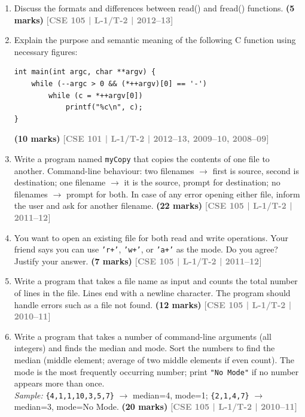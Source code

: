 \documentclass[12pt,a3paper]{article}
\newcommand{\yr}[1]{\hfill\textcolor{gray}{\small\textbf{[#1]}}}
\newcommand{\mk}[1]{\textcolor{orange!70!black}{\small\textbf{(#1 marks)}}}
\begin{document}
\begin{enumerate}
\item Discuss the formats and differences between read() and fread() functions.
\mk{5} \yr{CSE 105 | L-1/T-2 | 2012--13}

\item Explain the purpose and semantic meaning of the following C function using necessary figures:
 
\begin{lstlisting}
int main(int argc, char **argv) {
    while (--argc > 0 && (*++argv)[0] == '-')
        while (c = *++argv[0])
            printf("%c\n", c);
}
\end{lstlisting}
\mk{10} \yr{CSE 101 | L-1/T-2 | 2012--13, 2009--10, 2008--09}

\item Write a program named \texttt{myCopy} that copies the contents of one file to another. Command-line behaviour: two filenames $\to$ first is source, second is destination; one filename $\to$ it is the source, prompt for destination; no filenames $\to$ prompt for both. In case of any error opening either file, inform the user and ask for another filename.
\mk{22} \yr{CSE 105 | L-1/T-2 | 2011--12}

\item You want to open an existing file for both read and write operations. Your friend says you can use \texttt{'r+'}, \texttt{'w+'}, or \texttt{'a+'} as the mode. Do you agree? Justify your answer.
\mk{7} \yr{CSE 105 | L-1/T-2 | 2011--12}

\item Write a program that takes a file name as input and counts the total number of lines in the file. Lines end with a newline character. The program should handle errors such as a file not found.
\mk{12} \yr{CSE 105 | L-1/T-2 | 2010--11}

\item Write a program that takes a number of command-line arguments (all integers) and finds the median and mode. Sort the numbers to find the median (middle element; average of two middle elements if even count). The mode is the most frequently occurring number; print \texttt{"No Mode"} if no number appears more than once.\\
\textit{Sample:} \texttt{\{4,1,1,10,3,5,7\}} $\to$ median=4, mode=1; \quad \texttt{\{2,1,4,7\}} $\to$ median=3, mode=No Mode.
\mk{20} \yr{CSE 105 | L-1/T-2 | 2010--11}


\end{enumerate}
\end{document}
